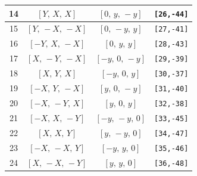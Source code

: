 \documentclass[fleqn,8pt]{jsarticle}
\begin{document}
\begin{longtable}{cccc}
14 & $\left[ Y,\, X,\, X \right]$ & $\left[ 0,\, y,\, - y \right]$ & {\tt [26,-44]} \\ \hline
15 & $\left[ Y,\, - X,\, - X \right]$ & $\left[ 0,\, - y,\, y \right]$ & {\tt [27,-41]} \\ \hline
16 & $\left[ - Y,\, X,\, - X \right]$ & $\left[ 0,\, y,\, y \right]$ & {\tt [28,-43]} \\ \hline
17 & $\left[ X,\, - Y,\, - X \right]$ & $\left[ - y,\, 0,\, - y \right]$ & {\tt [29,-39]} \\ \hline
18 & $\left[ X,\, Y,\, X \right]$ & $\left[ - y,\, 0,\, y \right]$ & {\tt [30,-37]} \\ \hline
19 & $\left[ - X,\, Y,\, - X \right]$ & $\left[ y,\, 0,\, - y \right]$ & {\tt [31,-40]} \\ \hline
20 & $\left[ - X,\, - Y,\, X \right]$ & $\left[ y,\, 0,\, y \right]$ & {\tt [32,-38]} \\ \hline
21 & $\left[ - X,\, X,\, - Y \right]$ & $\left[ - y,\, - y,\, 0 \right]$ & {\tt [33,-45]} \\ \hline
22 & $\left[ X,\, X,\, Y \right]$ & $\left[ y,\, - y,\, 0 \right]$ & {\tt [34,-47]} \\ \hline
23 & $\left[ - X,\, - X,\, Y \right]$ & $\left[ - y,\, y,\, 0 \right]$ & {\tt [35,-46]} \\ \hline
24 & $\left[ X,\, - X,\, - Y \right]$ & $\left[ y,\, y,\, 0 \right]$ & {\tt [36,-48]} \\
\end{longtable}
\renewcommand{\arraystretch}{1.2}
\end{document}
